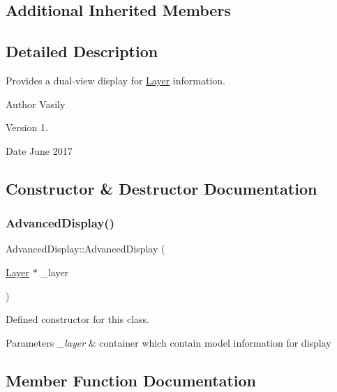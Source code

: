 \subsection*{Additional Inherited Members}


\subsection{Detailed Description}
Provides a dual-\/view display for \hyperlink{class_layer}{Layer} information. 

\begin{DoxyAuthor}{Author}
Vasily 
\end{DoxyAuthor}
\begin{DoxyVersion}{Version}
1. 
\end{DoxyVersion}
\begin{DoxyDate}{Date}
June 2017 
\end{DoxyDate}


\subsection{Constructor \& Destructor Documentation}
\mbox{\label{class_advanced_display_a12f2ccc1e24ed1d6d9a68cea1447166f}} 
\subsubsection{\texorpdfstring{Advanced\+Display()}{AdvancedDisplay()}}
{\footnotesize\ttfamily Advanced\+Display\+::\+Advanced\+Display (\begin{DoxyParamCaption}\item[{\hyperlink{class_layer}{Layer} $\ast$}]{\+\_\+layer }\end{DoxyParamCaption})}



Defined constructor for this class. 


\begin{DoxyParams}{Parameters}
{\em \+\_\+layer} & container which contain model information for display \\
\hline
\end{DoxyParams}


\subsection{Member Function Documentation}
\mbox{\label{class_advanced_display_adaa4a1772d599c5224bf8f0c3476138a}} 

